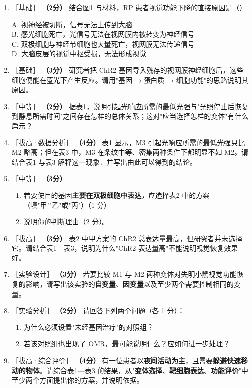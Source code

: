 \documentclass[UTF8,a4paper,11pt]{ctexart}
\newcommand{\pt}[1]{\textbf{（#1分）}}
\newcommand{\lv}[1]{{\small\color{deepgreen}［#1］}}
\newcommand{\tian}[1]{\underline{\hspace{#1}}}
\newcommand{\choice}[1]{\par\smallskip\noindent #1\par}
\begin{document}
\begin{enumerate}[leftmargin=2.2em,itemsep=6pt]
\item \lv{基础} \pt{2} 结合图1 与材料，RP 患者视觉功能下降的直接原因是（\quad）\\
\choice{A. 视神经被切断，信号无法上传到大脑\\
B. 感光细胞死亡，光信号无法在视网膜内被转变为神经信号\\
C. 双极细胞与神经节细胞也大量死亡，视网膜无法传递信号\\
D. 大脑皮层的视觉中枢受损，无法形成视觉}

\item \lv{基础} \pt{3} 研究者把 ChR2 基因导入残存的视网膜神经细胞后，这些细胞便能在蓝光下产生反应。请用"基因 → 蛋白质 → 细胞功能"的思路说明其原因。

\item \lv{中等} \pt{2} 据表1，说明引起光响应所需的最低光强与"光照停止后恢复到静息所需时间"之间存在怎样的总体关系；这对"应当选择怎样的变体"有什么启示？

\item \lv{拔高·数据分析} \pt{4} 表1 显示，M3 引起光响应所需的最低光强只比 M2 略高；但在表3 中，M3 在条纹中等、密集两种条件下都明显不如 M2。请结合表1 与表3 解释这一现象，并写出由此可以得到的结论。

\item \lv{中等} \pt{3}
\begin{enumerate}[label=(\arabic*),leftmargin=1.4em,itemsep=2pt]
\item 若要使目的基因\textbf{主要在双极细胞中表达}，应选择表2 中的方案\tian{0.8cm}（填"甲""乙"或"丙"）（1 分）
\item 说明你的判断理由（2 分）。
\end{enumerate}

\item \lv{拔高} \pt{3} 表2 中甲方案的 ChR2 总表达量最高，但研究者并未选择它。请结合表1—表3，说明为什么"ChR2 表达量高"不能说明视觉恢复效果好。

\item \lv{实验设计} \pt{3} 若要比较 M1 与 M2 两种变体对失明小鼠视觉功能恢复的影响，请写出该实验的\textbf{自变量}、\textbf{因变量}以及至少两个需要控制相同的变量。\tian{0.46\textwidth}

\item \lv{实验分析} \pt{2} 请回答下列两个问题（各 1 分）：
\begin{enumerate}[label=(\arabic*),leftmargin=1.4em,itemsep=2pt]
\item 为什么必须设置"未经基因治疗"的对照组？
\item 若该对照组也出现了 OMR，最可能说明什么？应如何进一步处理？
\end{enumerate}

\item \lv{拔高·综合评价} \pt{4} 有一位患者以\textbf{夜间活动为主}，且需要\textbf{躲避快速移动的物体}。请综合表1—表3 的结果，从"\textbf{变体选择}、\textbf{靶细胞表达}、\textbf{功能评价}"中至少两个方面提出你的方案，并说明依据。
\end{enumerate}
\end{document}
